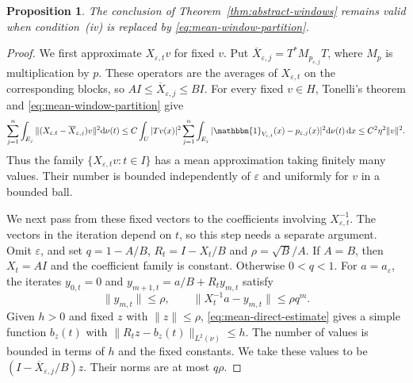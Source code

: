 \documentclass[12pt,reqno,tbtags]{amsart}
\newtheorem{proposition}{Proposition}[section]
\def\d{\mathrm{d}}
\newcommand\norm[1]{\|#1\|}
\newcommand\1{\mathbbm{1}}
\newcommand{\eps}{\varepsilon}
\def\d{\mathrm{d}}
\begin{document}
\begin{proposition}\label{prop:mean-window-criterion}
The conclusion of Theorem~\ref{thm:abstract-windows} remains valid when
condition~(iv) is replaced by \eqref{eq:mean-window-partition}.
\end{proposition}
\begin{proof}
We first approximate $X_{\eps,t}v$ for fixed $v$. Put
$\overline X_{\eps,j}=T^*M_{p_{\eps,j}}T$, where $M_p$ is multiplication by $p$.
These operators are the averages of $X_{\eps,t}$ on the corresponding blocks,
so $AI\le\overline X_{\eps,j}\le BI$.
For every fixed $v\in H$, Tonelli's theorem and
\eqref{eq:mean-window-partition} give
\begin{equation}\label{eq:mean-direct-estimate}
    \sum_{j=1}^{n}\int_{E_j}
    \norm{(X_{\eps,t}-\overline X_{\eps,j})v}^2\d\nu(t)
    \le C\int_U|Tv(x)|^2
       \sum_{j=1}^{n}\int_{E_j}|\1_{V_{\eps,t}}(x)-p_{\eps,j}(x)|^2
       \d\nu(t)\,\d x
    \le C^2\eta^2\norm v^2.
\end{equation}
Thus the family $\{X_{\eps,t}v:t\in I\}$ has a mean approximation taking
finitely many values. Their number is bounded independently of $\eps$
and uniformly for $v$ in a bounded ball.

We next pass from these fixed vectors to the coefficients involving $X_{\eps,t}^{-1}$.
The vectors in the iteration depend on $t$, so this step needs a separate
argument. Omit $\eps$, and set
$q=1-A/B$, $R_t=I-X_t/B$ and $\rho=\sqrt B/A$.
If $A=B$, then $X_t=AI$ and the coefficient family is constant.
Otherwise $0<q<1$. For $a=a_\eps$, the iterates
$y_{0,t}=0$ and $y_{m+1,t}=a/B+R_ty_{m,t}$ satisfy
\begin{equation*}
    \norm{y_{m,t}}\le\rho,\qquad
    \norm{X_t^{-1}a-y_{m,t}}\le\rho q^m.
\end{equation*}
Given $h>0$ and fixed $z$ with $\norm z\le\rho$,
\eqref{eq:mean-direct-estimate} gives a simple function $b_z(t)$ with
$\norm{R_tz-b_z(t)}_{L^2(\nu)}\le h$.
The number of values is bounded in terms of $h$ and the fixed constants.
We take these values to be $(I-\overline X_{\eps,j}/B)z$.
Their norms are at most $q\rho$.


\end{proof}
\end{document}
